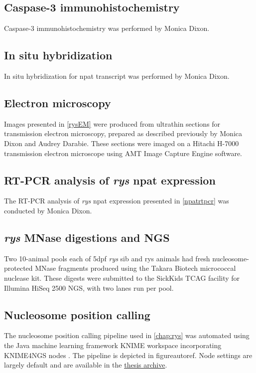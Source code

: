 \subsection{Caspase-3 immunohistochemistry}
Caspase-3 immunohistochemistry was performed by Monica Dixon. 

\subsection{In situ hybridization}
In situ hybridization for npat transcript was performed by Monica Dixon.

\subsection{Electron microscopy}
Images presented in \autoref{rysEM} were produced from ultrathin sections for transmission electron microscopy, prepared as described previously \cite{Lindsey2012} by Monica Dixon and Audrey Darabie. These sections were imaged on a Hitachi H-7000 transmission electron microscope using AMT Image Capture Engine software. 

\subsection{RT-PCR analysis of \textit{rys} npat expression}
The RT-PCR analysis of \textit{rys} npat expression presented in \autoref{npatrtpcr} was conducted by Monica Dixon.

\subsection{\textit{rys} MNase digestions and NGS}
Two 10-animal pools each of 5dpf \textit{rys} sib and rys animals had fresh nucleosome-protected MNase fragments produced using the Takara Biotech micrococcal nuclease kit. These digests were submitted to the SickKids TCAG  facility for Illumina HiSeq 2500 NGS, with two lanes run per pool.

\subsection{Nucleosome position calling}
The nucleosome position calling pipeline used in \autoref{chap:rys} was automated using the Java machine learning framework KNIME \cite{Dietz2016} workspace incorporating KNIME4NGS nodes \cite{Hastreiter2017}. The pipeline is depicted in figureautoref. Node settings are largely default and are available in the  \hyperref[sec:archive]{thesis archive}.

